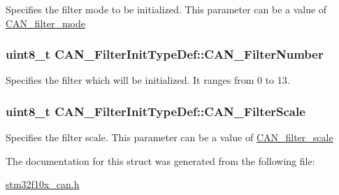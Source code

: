 Specifies the filter mode to be initialized. This parameter can be a value of \hyperlink{group__CAN__filter__mode}{CAN\_\-filter\_\-mode} \hypertarget{structCAN__FilterInitTypeDef_af94466e1138c2b4fe6a67cf556981193}{
\subsubsection[{CAN\_\-FilterNumber}]{\setlength{\rightskip}{0pt plus 5cm}uint8\_\-t {\bf CAN\_\-FilterInitTypeDef::CAN\_\-FilterNumber}}}
\label{structCAN__FilterInitTypeDef_af94466e1138c2b4fe6a67cf556981193}
Specifies the filter which will be initialized. It ranges from 0 to 13. \hypertarget{structCAN__FilterInitTypeDef_a9d52661aca538dbfcafdda6f16dddc82}{
\subsubsection[{CAN\_\-FilterScale}]{\setlength{\rightskip}{0pt plus 5cm}uint8\_\-t {\bf CAN\_\-FilterInitTypeDef::CAN\_\-FilterScale}}}
\label{structCAN__FilterInitTypeDef_a9d52661aca538dbfcafdda6f16dddc82}
Specifies the filter scale. This parameter can be a value of \hyperlink{group__CAN__filter__scale}{CAN\_\-filter\_\-scale} 

The documentation for this struct was generated from the following file:\begin{DoxyCompactItemize}
\item 
\hyperlink{stm32f10x__can_8h}{stm32f10x\_\-can.h}\end{DoxyCompactItemize}
